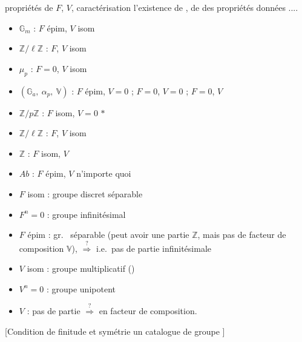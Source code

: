 \documentclass[11pt,a4paper]{article}
\begin{document}
\ill{} propriétés de $F$, $V$, caractérisation \ill{} l'existence de
\ill{}, de  \ill{} des propriétés données ....

\begin{itemize}
\item $\mathbb{G}_m$ : $F$ épim, $V$ isom
\item $\mathbb{Z}/\ell\mathbb{Z}$ : $F$, $V$ isom
\item \struck{$\mu$}$\mu_p$ : $F = 0$, $V$ isom
\item $(\mathbb{G}_a,\ \alpha_p,\ \mathbb{V})$ : $F$ épim, $V = 0$ ; $F = 0$,
$V = 0$ ; $F = 0$, $V$ \struck{\ill{}} 
\item $\mathbb{Z}/p\mathbb{Z}$ : $F$ isom, $V = 0$ \quad $\ast$
\item $\mathbb{Z}/\ell\mathbb{Z}$ : $F$, $V$ isom
\item $\mathbb{Z}$ : $F$ isom, $V$ 
\item $Ab$ : $F$ épim, $V$ n'importe quoi
\end{itemize}

\begin{itemize}
\item $F$ isom : groupe discret séparable
\item $F^n = 0$ : groupe infinitésimal
\item $F$ épim : gr.\ \add{\ill{}} \struck{\ill{}} séparable (peut avoir
une partie $\mathbb{Z}$, mais pas de facteur de composition $\mathbb{V}$),
$\overset{?}{\Longrightarrow}$ i.e.\ pas de partie infinitésimale
\end{itemize}

\begin{itemize}
\item $V$ isom : groupe multiplicatif (\ill{})
\item $V^n = 0$ : groupe \struck{\ill{}} unipotent
\item $V$  :  pas de partie
 \ill{} $\overset{?}{\Longrightarrow}$ en facteur de
composition.
\end{itemize}

[Condition de finitude \ill{} et symétrie \ill{} un catalogue \ill{} \ill{}
de groupe \ill{} \ill{} \ill{} \ill{} \ill{}]
\end{document}
